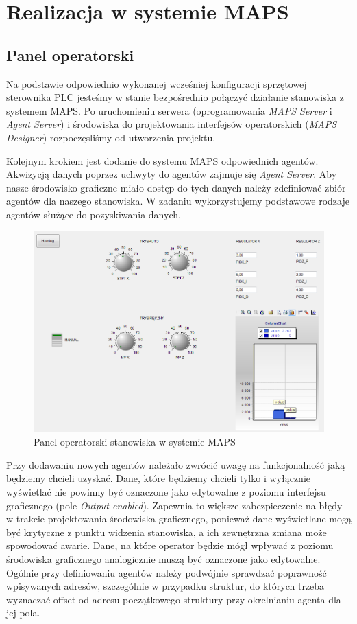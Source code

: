 \documentclass{mwrep}
\begin{document}
\chapter{Realizacja w systemie MAPS}
\label{MAPS}

\section{Panel operatorski}
\label{MAPS::PanelOperatorski}

Na podstawie odpowiednio wykonanej wcześniej konfiguracji sprzętowej sterownika PLC jesteśmy w stanie bezpośrednio połączyć działanie stanowiska z systemem MAPS. Po uruchomieniu serwera (oprogramowania \emph{MAPS Server} i \emph{Agent Server}) i środowiska do projektowania interfejsów operatorskich (\emph{MAPS Designer}) rozpoczęsliśmy od utworzenia projektu.

Kolejnym krokiem jest dodanie do systemu MAPS odpowiednich agentów. Akwizycją danych poprzez uchwyty do agentów zajmuje się \emph{Agent Server}. Aby nasze środowisko graficzne miało dostęp do tych danych należy zdefiniować zbiór agentów dla naszego stanowiska. W zadaniu wykorzystujemy podstawowe rodzaje agentów służące do pozyskiwania danych. 

\begin{figure}[H]
    \label{MAPS::PanelOperatorski}
  
    \includegraphics[scale=0.45]{panel_operatorski.png}
    \caption{Panel operatorski stanowiska w systemie MAPS}
\end{figure}

Przy dodawaniu nowych agentów należało zwrócić uwagę na funkcjonalność jaką będziemy chcieli uzyskać. Dane, które będziemy chcieli tylko i wyłącznie wyświetlać nie powinny być oznaczone jako edytowalne z poziomu interfejsu graficznego (pole  \emph{Output enabled}). Zapewnia to większe zabezpieczenie na błędy w trakcie projektowania środowiska graficznego, ponieważ dane wyświetlane mogą być krytyczne z punktu widzenia stanowiska, a ich zewnętrzna zmiana może spowodować awarie. Dane, na które operator będzie mógł wpływać z poziomu środowiska graficznego analogicznie muszą być oznaczone jako edytowalne. Ogólnie przy definiowaniu agentów należy podwójnie sprawdzać poprawność wpisywanych adresów, szczególnie w przypadku struktur, do których trzeba wyznaczać offset od adresu początkowego struktury przy okrelnianiu agenta dla jej pola.
\end{document}
